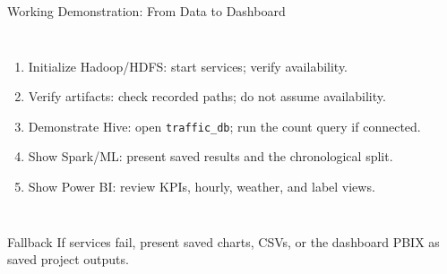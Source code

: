 \documentclass[aspectratio=169,11pt]{beamer}
\begin{document}
\begin{frame}[t]{Working Demonstration: From Data to Dashboard}
\vspace{-1mm}
\begin{columns}[T,onlytextwidth]
\small
\begin{enumerate}\itemsep1pt
\item Initialize Hadoop/HDFS: start services; verify availability.
\item Verify artifacts: check recorded paths; do not assume availability.
\item Demonstrate Hive: open \texttt{traffic\_db}; run the count query if connected.
\item Show Spark/ML: present saved results and the chronological split.
\item Show Power BI: review KPIs, hourly, weather, and label views.
\end{enumerate}
\centering
{}
\end{columns}

\vfill
\begin{alertblock}{Fallback}
\footnotesize
If services fail, present saved charts, CSVs, or the dashboard PBIX as saved project outputs.
\end{alertblock}
\vspace{2mm}
\end{frame}
\end{document}
